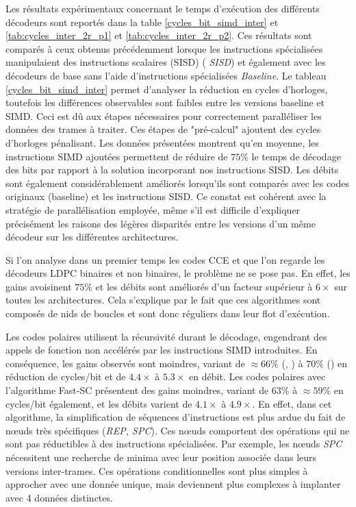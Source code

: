 \documentclass[../main.tex]{subfiles}
\begin{document}
Les résultats expérimentaux concernant le temps d'exécution des différents décodeurs sont reportés dans la table \ref{cycles_bit_simd_inter} et \ref{tab:cycles_inter_2r_p1} et \ref{tab:cycles_inter_2r_p2}.
Ces résultats sont comparés à ceux obtenus précédemment lorsque les instructions spécialisées manipulaient des instructions scalaires (SISD) (\textit{ SISD}) et également avec les décodeurs de base sans l'aide d'instructions spécialisées \textit{ Baseline}.
Le tableau \ref{cycles_bit_simd_inter} permet d’analyser la réduction en cycles d’horloges, toutefois les différences observables sont faibles entre les versions baseline et SIMD. Ceci est dû aux étapes nécessaires pour correctement paralléliser les données des trames à traiter. Ces étapes de "pré-calcul" ajoutent des cycles d’horloges pénalisant.
Les données présentées montrent qu'en moyenne, les instructions SIMD ajoutées permettent de réduire de $75\%$ le temps de décodage des bits par rapport à la solution incorporant nos instructions SISD. 
Les débits sont également considérablement améliorés lorsqu'ils sont comparés avec les codes originaux (baseline) et les instructions SISD.
Ce constat est cohérent avec la stratégie de parallélisation employée, même s'il est difficile d'expliquer précisément les raisons des légères disparités entre les versions d'un même décodeur sur les différentes architectures.

Si l'on analyse dans un premier temps les codes CCE et que l'on regarde les décodeurs LDPC binaires et non binaires, le problème ne se pose pas.
En effet, les gains avoisinent $75\%$ et les débits sont améliorés d'un facteur supérieur à $6\times$ sur toutes les architectures. 
Cela s'explique par le fait que ces algorithmes sont composés de nids de boucles et sont donc réguliers dans leur flot d'exécution.

Les codes polaires utilisent la récursivité durant le décodage, engendrant des appels de fonction non accélérés par les instructions SIMD introduites. 
En conséquence, les gains observés sont moindres, variant de $\approx 66\%$ (\IBEX , \RISCY ) à $70\%$ (\SCR) en réduction de cycles/bit et de $4.4\times$ à $5.3\times$ en débit. 
Les codes polaires avec l'algorithme Fast-SC présentent des gains moindres, variant de $63\%$ à $\approx 59\%$ en cycles/bit également, et les débits varient de $4.1\times$ à $4.9\times$. 
En effet, dans cet algorithme, la simplification de séquences d'instructions est plus ardue du fait de nœuds très spécifiques (\textit{REP, SPC}). 
Ces nœuds comportent des opérations qui ne sont pas réductibles à des instructions spécialisées.
Par exemple, les nœuds \textit{SPC} nécessitent une recherche de minima avec leur position associée dans leurs versions inter-trames. 
Ces opérations conditionnelles sont plus simples à approcher avec une donnée unique, mais deviennent plus complexes à implanter avec 4 données distinctes.  
\end{document}
